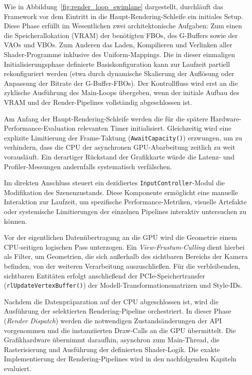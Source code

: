 Wie in Abbildung~\ref{fig:render_loop_swimlane} dargestellt, durchläuft das Framework vor dem Eintritt in die
Haupt-Rendering-Schleife ein initiales Setup.
Diese Phase erfüllt im Wesentlichen zwei architektonische Aufgaben: Zum einen die Speicherallokation (\ac{VRAM}) der
benötigten \ac{FBO}s, des \ac{G-Buffer}s sowie der \ac{VAO}s und \ac{VBO}s.
Zum Anderen das Laden, Kompilieren und Verlinken aller Shader-Programme inklusive des Uniform-Mappings.
Die in dieser einmaligen Initialisierungsphase definierte Basiskonfiguration kann zur Laufzeit partiell rekonfiguriert
werden (etwa durch dynamische Skalierung der Auflösung oder Anpassung der Bitrate der \ac{G-Buffer}-\ac{FBO}s).
Der Kontrollfluss wird erst an die zyklische Ausführung des Main-Loops übergeben, wenn der initiale Aufbau des \ac{VRAM}
und der Render-Pipelines vollständig abgeschlossen ist.

Am Anfang der Haupt-Rendering-Schleife werden die für die spätere Hardware-Performance-Evaluation relevanten Timer
initialisiert.
Gleichzeitig wird eine explizite Limitierung der Frame-Taktung (\texttt{AwaitCapacity()}) erzwungen, um zu verhindern,
dass die \ac{CPU} der asynchronen \ac{GPU}-Abarbeitung zeitlich zu weit vorausläuft.
Ein derartiger Rückstand der Grafikkarte würde die Latenz- und Profiler-Messungen andernfalls systematisch verfälschen.

Im direkten Anschluss steuert ein dezidiertes \texttt{InputController}-Modul die Modifikation des Szenenzustands.
Diese Komponente ermöglicht eine manuelle Interaktion zur Laufzeit, um spezifische Performance-Metriken, visuelle
Artefakte oder systemische Limitierungen der einzelnen Pipelines interaktiv untersuchen zu können.

Vor der eigentlichen Datenübertragung an die \ac{GPU} wird die Geometrie einem \ac{CPU}-seitigen logischen Pass
unterzogen.
Ein \textit{View-Frustum-Culling} dient hierbei als Filter, um Geometrien, die sich außerhalb des
sichtbaren Bereichs der Kamera befinden, von der weiteren Verarbeitung auszuschließen.
Für die verbleibenden, sichtbaren Entitäten erfolgt anschließend der \ac{PCIe}-Speichertransfer
(\texttt{rlUpdateVertexBuffer()}) der Modell-Transformationsmatrizen und Style-IDs.

Nachdem die Datenpräparation auf der \ac{CPU} abgeschlossen ist, wird die Ausführung der selektierten Rendering-Pipeline
orchestriert.
In dieser Phase (\textit{Render Dispatch}) werden die notwendigen Zustandsänderungen der \ac{API} vorgenommen und die
instanziierten Draw-Calls an die \ac{GPU} übermittelt.
Die Grafikhardware übernimmt daraufhin, asynchron zum Main-Thread, die Rasterisierung und Ausführung der definierten
Shader-Logik.
Die exakte Implementierung der Rendering-Pipelines wird in den nachfolgenden Kapiteln evaluiert.

